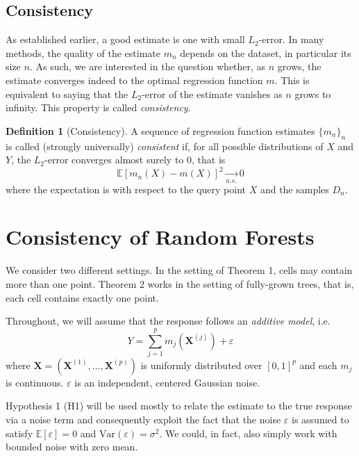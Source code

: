 \documentclass[10pt]{article}
\theoremstyle{definition}
\newtheorem{mydef}{Definition}[section]
\begin{document}
\subsection{Consistency}

As established earlier, a good estimate is one with small $L_{2}$-error.
In many methods, the quality of the estimate $m_{n}$ depends on the
dataset, in particular its size $n$. As such, we are interested in the question
whether, as $n$ grows, the estimate converges indeed to the optimal 
regression function $m$. This is equivalent to saying that the $L_{2}$-error of the
estimate vanishes as $n$ grows to infinity. This property is called
\textit{consistency}.

\begin{mydef}[Consistency]
  A sequence of regression function estimates $\{ m_{n} \}_{n}$ is called
  (strongly universally) \textit{consistent} if, for all possible distributions
  of $X$ and $Y$, the $L_{2}$-error converges almost surely to 0, that is
$$
\mathbb{E}[m_{n}(X) - m(X)]^2 \underset{a.s.}{\rightarrow} 0
$$
where the expectation is with respect to the query point $X$ and the
samples $D_n$.
\end{mydef}


\section{Consistency of Random Forests}

We consider two different settings. In the setting of Theorem 1, cells may
contain more than one point. Theorem 2 works in the setting of fully-grown
trees, that is, each cell contains exactly one point. 

\begin{mainhyp}[1]
  Throughout, we will assume that the response follows an \textit{additive
    model}, i.e.
  $$
  Y=\sum_{j=1}^p m_j\left(\mathbf{X}^{(j)}\right)+\varepsilon
  $$
  where $\mathbf{X}=\left(\mathbf{X}^{(1)}, \ldots, \mathbf{X}^{(p)}\right)$ is
  uniformly distributed over $[0,1]^p$ and each $m_{j}$ is continuous.
  $\varepsilon$ is an independent, centered Gaussian noise. 
\end{mainhyp}

Hypothesis 1 (H1) will be used mostly to relate the estimate to the true response via
a noise term and consequently exploit the fact that the noise $\varepsilon$ is
assumed to satisfy $\mathbb{E}\left[ \varepsilon \right] = 0$ and
$\text{Var}(\varepsilon) = \sigma^2$. We could, in fact, also simply work with
bounded noise with zero mean.
\end{document}
